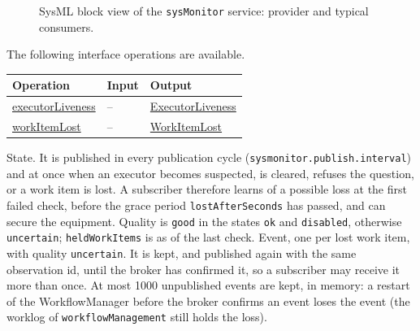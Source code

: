 \documentclass[a4paper]{arrowhead}
\newcommand{\mref}[1]{{\textcolor{ArrowheadPurple}{\hyperref[sec:model:#1]{#1}}}}
\newcommand{\oref}[1]{{\textcolor{ArrowheadBlue}{\hyperref[sec:operations:#1]{#1}}}}
\begin{document}
\begin{figure}[ht!]
  \centering
  \caption{SysML block view of the \texttt{sysMonitor} service: provider and typical consumers.}
  \label{fig:SD}
\end{figure}

The following interface operations are available.

{\small
\begin{longtable}{|p{4.4cm}|p{5.6cm}|p{5.8cm}|}

\hline
\rowcolor{gray!33} Operation & Input & Output \\ \hline
\endhead
\oref{executorLiveness} & -- & \mref{ExecutorLiveness} \\ \hline
\oref{workItemLost} & -- & \mref{WorkItemLost} \\ \hline
\end{longtable}
}

State. It is published in every publication cycle (\texttt{sysmonitor.\allowbreak{}publish.\allowbreak{}interval}) and at once when an
executor becomes suspected, is cleared, refuses the question, or a work item is lost. A subscriber therefore learns of a
possible loss at the first failed check, before the grace period \texttt{lost\allowbreak{}After\allowbreak{}Seconds} has passed, and can secure the
equipment. Quality is \texttt{good} in the states \texttt{ok} and \texttt{disabled}, otherwise \texttt{uncertain};
\texttt{heldWorkItems} is as of the last check.
Event, one per lost work item, with quality \texttt{uncertain}. It is kept, and published again with the same
observation id, until the broker has confirmed it, so a subscriber may receive it more than once. At most 1000
unpublished events are kept, in memory: a restart of the WorkflowManager before the broker confirms an event loses the
event (the worklog of \texttt{workflow\allowbreak{}Management} still holds the loss).
\end{document}
